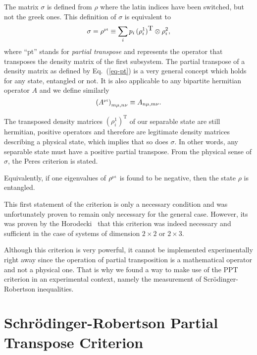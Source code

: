 The matrix $\sigma$ is defined from $\rho$ where the latin indices have been switched, but not the greek ones. This definition of $\sigma$ is equivalent to
\[ \sigma=\rho^{\mbox{\tiny \textup{pt}}}  \equiv  \sum_i p_i \, (\rho^1_i)^{\mbox{T}} \otimes \rho^2_i, \]
where ``pt'' stands for \textit{partial transpose} and represents the operator that transposes the density matrix of the first subsystem. The partial transpose of a density matrix as defined by Eq.~(\ref{eq-pt}) is a very general concept which holds for any state, entangled or not. It is also applicable to any bipartite hermitian operator $A$ and we define similarly
\[  \left(A^{\mbox{\tiny \textup{pt}}} \right)_{m\mu,n\nu} \equiv  A_{n\mu,m\nu}.\]

The transposed density matrices $(\rho^1_i)^{\mbox{T}}$ of our separable state are still hermitian, positive operators and therefore are legitimate density matrices describing a physical state, which implies that so does $\sigma$. In other words, any separable state must have a positive partial transpose. From the physical sense of $\sigma$, the Peres criterion is stated.


Equivalently, if one eigenvalues of $\rho^{\mbox{\tiny \textup{pt}}}$ is found to be negative, then the state $\rho$ is entangled.

This first statement of the criterion is only a necessary condition and was unfortunately proven to remain only necessary for the general case. However, its was proven by the Horodecki~\cite{HHH96} that this criterion was indeed necessary and sufficient in the case of systems of dimension $2\times 2$ or $2\times 3$.


Although this criterion is very powerful, it cannot be implemented experimentally right away since the operation of partial transposition is a mathematical operator and not a physical one. That is why we found a way to make use of the PPT criterion in an experimental context, namely the measurement of Scr\"odinger-Robertson inequalities.

\section{Schr\"odinger-Robertson Partial Transpose Criterion} \label{sec-SRPT}

